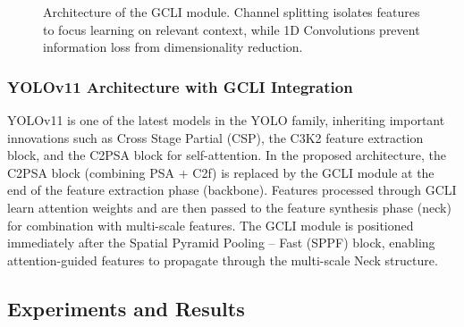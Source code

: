 \begin{figure}[h]
{%
    }
    \caption{Architecture of the GCLI module. Channel splitting isolates features to focus learning on relevant context, while 1D Convolutions prevent information loss from dimensionality reduction.}
    \label{fig:gcli_architecture}
\end{figure}

\subsubsection{YOLOv11 Architecture with GCLI Integration}
YOLOv11 is one of the latest models in the YOLO family, inheriting important innovations such as Cross Stage Partial (CSP), the C3K2 feature extraction block, and the C2PSA block for self-attention. In the proposed architecture, the C2PSA block (combining PSA + C2f) is replaced by the GCLI module at the end of the feature extraction phase (backbone). Features processed through GCLI learn attention weights and are then passed to the feature synthesis phase (neck) for combination with multi-scale features. The GCLI module is positioned immediately after the Spatial Pyramid Pooling -- Fast (SPPF) block, enabling attention-guided features to propagate through the multi-scale Neck structure.

\subsection{Experiments and Results}

